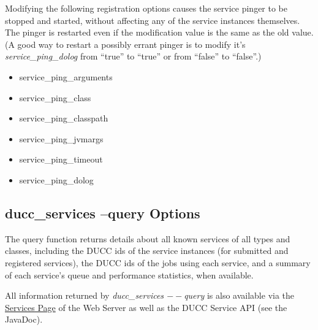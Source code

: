     Modifying the following registration options causes the service pinger to be stopped and
    started, without affecting any of the service instances themselves.  The pinger is restarted
    even if the modification value is the same as the old value. (A good way to restart
    a possibly errant pinger is to modify it's {\em service\_ping\_dolog} from ``true'' to ``true'' or
    from ``false'' to ``false''.)
    \begin{itemize}
      \item service\_ping\_arguments
      \item service\_ping\_class
      \item service\_ping\_classpath
      \item service\_ping\_jvmargs
      \item service\_ping\_timeout
      \item service\_ping\_dolog
    \end{itemize}
    
    \subsection{ducc\_services --query Options}
    The query function returns details about all known services of all types and classes, including 
    the DUCC ids of the service instances (for submitted and registered services), the DUCC ids of 
    the jobs using each service, and a summary of each service's queue and performance statistics, 
    when available. 
    
    All information returned by {\em ducc\_services $--$query} is also available via the
    \hyperref[ws:services-page]{Services Page} of the Web Server as well as the DUCC Service API (see 
    the JavaDoc).

